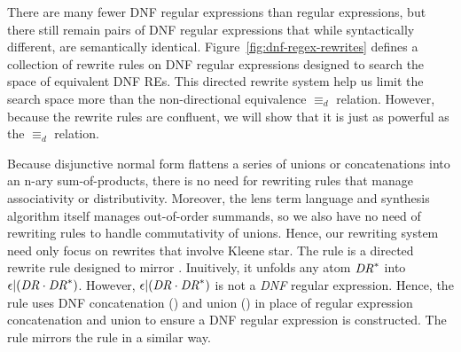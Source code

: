 \documentclass[numbers,10pt,preprint\ifanon ,nocopyrightspace\fi]{sigplanconf}
\begin{document}
There are many fewer DNF regular expressions than regular expressions, but there
still remain pairs of DNF regular expressions that while syntactically different,
are semantically identical.  
Figure~\ref{fig:dnf-regex-rewrites} defines a collection of rewrite rules on DNF regular expressions
designed to search the space of equivalent DNF REs.  
This directed rewrite system help us limit
the search space more than the non-directional equivalence $\equiv_d$ relation.
However, because the rewrite rules are confluent, we will show that it is just as powerful as the
$\equiv_d$ relation.
 

Because disjunctive normal form flattens a series of unions or concatenations
into an n-ary sum-of-products,
there is no need for rewriting rules that manage associativity or
distributivity.  Moreover, the lens term language and synthesis algorithm itself manages out-of-order summands, so we also have no need of rewriting
rules to handle commutativity of unions.  Hence, our rewriting system
need only focus on rewrites that involve Kleene star.
The rule \AtomUnrollstarLeftRule{} is a directed rewrite rule
designed to mirror \UnrollstarLeftRule{}.  Inuitively, it unfolds any atom 
${\mathit{DR}{}}^*$ into $\epsilon{}|(\mathit{DR}{}\cdot{{\ensuremath{\mathit{DR}}{}}}^*)$.  However, 
$\epsilon{}|(\mathit{DR}{}\cdot{{\ensuremath{\mathit{DR}}{}}}^*)$ is
not a \emph{DNF} regular expression.  Hence, the rule uses DNF concatenation (\ConcatDNF)
and union (\OrDNF) in place of regular expression concatenation and union
to ensure a DNF regular expression is constructed.  The rule
\AtomUnrollstarRightRule{} mirrors the rule \UnrollstarRightRule{} in 
a similar way.
\end{document}
